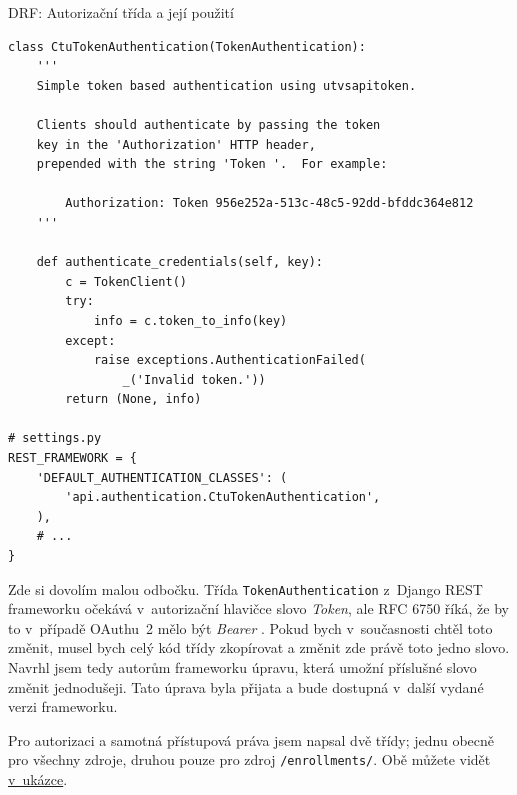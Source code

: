 \begin{listing}[htbp]
\caption{{\label{code:drf:auth}DRF: Autorizační třída a její použití}}
\begin{verbatim}
class CtuTokenAuthentication(TokenAuthentication):
    '''
    Simple token based authentication using utvsapitoken.

    Clients should authenticate by passing the token
    key in the 'Authorization' HTTP header,
    prepended with the string 'Token '.  For example:

        Authorization: Token 956e252a-513c-48c5-92dd-bfddc364e812
    '''

    def authenticate_credentials(self, key):
        c = TokenClient()
        try:
            info = c.token_to_info(key)
        except:
            raise exceptions.AuthenticationFailed(
                _('Invalid token.'))
        return (None, info)

# settings.py
REST_FRAMEWORK = {
    'DEFAULT_AUTHENTICATION_CLASSES': (
        'api.authentication.CtuTokenAuthentication',
    ),
    # ...
}
\end{verbatim}
\end{listing}

Zde si dovolím malou odbočku. Třída \verb!TokenAuthentication! z~Django REST frameworku očekává v~autorizační hlavičce slovo \emph{Token}, ale RFC 6750 říká, že by to v~případě OAuthu~2 mělo být \emph{Bearer} \autocite{rfc6750}. Pokud bych v~současnosti chtěl toto změnit, musel bych celý kód třídy zkopírovat a změnit zde právě toto jedno slovo. Navrhl jsem tedy autorům frameworku úpravu, která umožní příslušné slovo změnit jednodušeji. Tato úprava byla přijata a bude dostupná v~další vydané verzi frameworku.

Pro autorizaci a samotná přístupová práva jsem napsal dvě třídy; jednu obecně pro všechny zdroje, druhou pouze pro zdroj \verb!/enrollments/!. Obě můžete vidět \protect\hyperlink{code:drf:permissions}{v~ukázce}.

